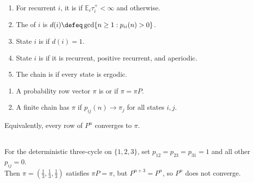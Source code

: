 \begin{definition} \label{def:markov-period-ergodic-state} 
\begin{enumerate}[label=(\roman*)]
\setlength{\itemsep}{0pt}
\item For recurrent $i$, it is  if $\mathbb{E}_i\tau_i^+<\infty$ and  otherwise.
\item The  of $i$ is $d(i)\defeq\gcd\{n\geq1:p_{ii}(n)>0\}$.
\item State $i$ is  if $d(i)=1$.
\item State $i$ is  if it is recurrent, positive recurrent, and aperiodic.
\item The chain is  if every state is ergodic.
\end{enumerate}
\end{definition}

\begin{definition} \label{def:markov-stationary-limiting-distributions} 
\begin{enumerate}[label=(\roman*)]
\setlength{\itemsep}{0pt}
\item A probability row vector $\pi$ is  or  if $\pi=\pi P$.
\item A finite chain has  $\pi$ if $p_{ij}(n)\to\pi_j$ for all states $i,j$.
\end{enumerate}
Equivalently, every row of $P^n$ converges to $\pi$.
\end{definition}

\begin{remark} \label{rem:stationary-does-not-imply-convergent} \\
For the deterministic three-cycle on $\{1,2,3\}$, set $p_{12}=p_{23}=p_{31}=1$ and all other $p_{ij}=0$.\\
Then $\pi=(\frac{1}{3},\frac{1}{3},\frac{1}{3})$ satisfies $\pi P=\pi$, but $P^{n+3}=P^n$, so $P^n$ does not converge.
\end{remark}

